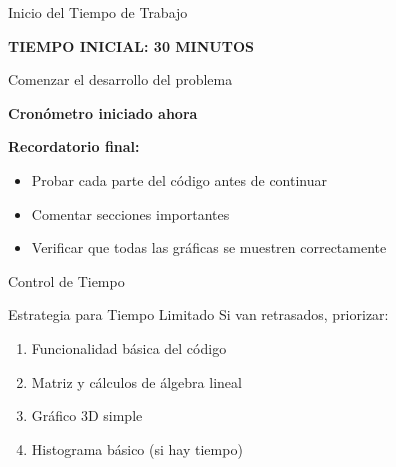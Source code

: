 \documentclass[10pt]{beamer}
\begin{document}
\begin{frame}{Inicio del Tiempo de Trabajo}
  \begin{block}{}
    \begin{center}
      \huge{\textbf{TIEMPO INICIAL: 30 MINUTOS}}
      
      \vspace{0.5cm}
      
      \large{Comenzar el desarrollo del problema}
      
      \vspace{0.5cm}
      
      \textbf{Cronómetro iniciado ahora}
    \end{center}
  \end{block}
  
  \textbf{Recordatorio final:}
  \begin{itemize}
    \item Probar cada parte del código antes de continuar
    \item Comentar secciones importantes
    \item Verificar que todas las gráficas se muestren correctamente
  \end{itemize}
\end{frame}

\begin{frame}{Control de Tiempo}
  \begin{alertblock}{Estrategia para Tiempo Limitado}
    Si van retrasados, priorizar:
    \begin{enumerate}
      \item Funcionalidad básica del código
      \item Matriz y cálculos de álgebra lineal
      \item Gráfico 3D simple
      \item Histograma básico (si hay tiempo)
    \end{enumerate}
  \end{alertblock}
\end{frame}

\end{document}
